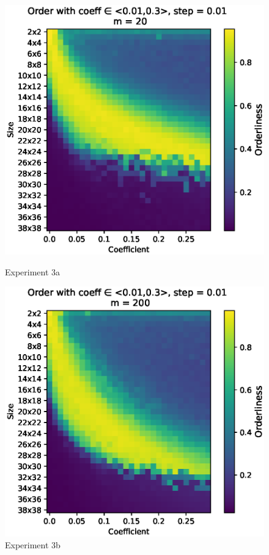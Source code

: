 \documentclass[a4paper, 11pt]{article}
\begin{document}
\begin{figure}
\centering
\begin{minipage}{.5\textwidth}
  \centering
  \includegraphics[width=1.1\linewidth]{exp2_2d1}
  \caption{Experiment 3a \label{Exp21}}
\end{minipage}%
\begin{minipage}{.5\textwidth}
  \centering
  \includegraphics[width=1.1\linewidth]{exp2_2d2}
  \caption{Experiment 3b \label{Exp22}}
\end{minipage}
\end{figure}
\end{document}
